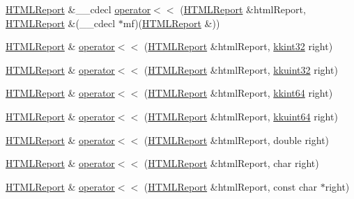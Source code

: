 \begin{DoxyCompactItemize}
\item 
\hyperlink{class_k_k_b_1_1_h_t_m_l_report}{H\+T\+M\+L\+Report} \&\+\_\+\+\_\+cdecl \hyperlink{namespace_k_k_b_a671111bc5d6ca669c6cdea173621140b}{operator$<$$<$} (\hyperlink{class_k_k_b_1_1_h_t_m_l_report}{H\+T\+M\+L\+Report} \&html\+Report, \hyperlink{class_k_k_b_1_1_h_t_m_l_report}{H\+T\+M\+L\+Report} \&(\+\_\+\+\_\+cdecl $\ast$mf)(\hyperlink{class_k_k_b_1_1_h_t_m_l_report}{H\+T\+M\+L\+Report} \&))
\item 
\hyperlink{class_k_k_b_1_1_h_t_m_l_report}{H\+T\+M\+L\+Report} \& \hyperlink{namespace_k_k_b_a09becdbc088274961b9230e8a79c46f3}{operator$<$$<$} (\hyperlink{class_k_k_b_1_1_h_t_m_l_report}{H\+T\+M\+L\+Report} \&html\+Report, \hyperlink{namespace_k_k_b_a8fa4952cc84fda1de4bec1fbdd8d5b1b}{kkint32} right)
\item 
\hyperlink{class_k_k_b_1_1_h_t_m_l_report}{H\+T\+M\+L\+Report} \& \hyperlink{namespace_k_k_b_a5e869b469b56d1a9ed006db060f0da9e}{operator$<$$<$} (\hyperlink{class_k_k_b_1_1_h_t_m_l_report}{H\+T\+M\+L\+Report} \&html\+Report, \hyperlink{namespace_k_k_b_af8d832f05c54994a1cce25bd5743e19a}{kkuint32} right)
\item 
\hyperlink{class_k_k_b_1_1_h_t_m_l_report}{H\+T\+M\+L\+Report} \& \hyperlink{namespace_k_k_b_a442063ff57d33a591f372308cece648f}{operator$<$$<$} (\hyperlink{class_k_k_b_1_1_h_t_m_l_report}{H\+T\+M\+L\+Report} \&html\+Report, \hyperlink{namespace_k_k_b_aa3486b1c5ea9162b3b020c69f72826eb}{kkint64} right)
\item 
\hyperlink{class_k_k_b_1_1_h_t_m_l_report}{H\+T\+M\+L\+Report} \& \hyperlink{namespace_k_k_b_a6647da59ec9998559a3aa9dab1571c57}{operator$<$$<$} (\hyperlink{class_k_k_b_1_1_h_t_m_l_report}{H\+T\+M\+L\+Report} \&html\+Report, \hyperlink{namespace_k_k_b_a1f2b0568d3b63cc7697dcff73250113e}{kkuint64} right)
\item 
\hyperlink{class_k_k_b_1_1_h_t_m_l_report}{H\+T\+M\+L\+Report} \& \hyperlink{namespace_k_k_b_a870cacd01e60b2382fd4cee4c2c3491d}{operator$<$$<$} (\hyperlink{class_k_k_b_1_1_h_t_m_l_report}{H\+T\+M\+L\+Report} \&html\+Report, double right)
\item 
\hyperlink{class_k_k_b_1_1_h_t_m_l_report}{H\+T\+M\+L\+Report} \& \hyperlink{namespace_k_k_b_a9c86ca2fbea1efe51254249590d8b1cc}{operator$<$$<$} (\hyperlink{class_k_k_b_1_1_h_t_m_l_report}{H\+T\+M\+L\+Report} \&html\+Report, char right)
\item 
\hyperlink{class_k_k_b_1_1_h_t_m_l_report}{H\+T\+M\+L\+Report} \& \hyperlink{namespace_k_k_b_ada7241e33e9e32c43e070966ca8b25ec}{operator$<$$<$} (\hyperlink{class_k_k_b_1_1_h_t_m_l_report}{H\+T\+M\+L\+Report} \&html\+Report, const char $\ast$right)

\end{DoxyCompactItemize}
